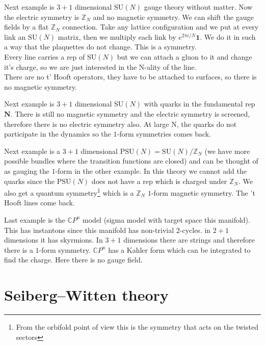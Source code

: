 \documentclass[11pt]{article}
\theoremstyle{definition}
\numberwithin{equation}{section}
\newcommand*\bbC{\mathbb{C}}
\newcommand*\bbZ{\mathbb{Z}}
\newcommand*\SU{\mathrm{SU}}
\begin{document}
Next example is $3+1$ dimensional $\SU(N)$ gauge theory without matter. Now the electric symmetry is $\bbZ_{N}$ and no magnetic symmetry. We can shift the gauge fields by a flat $\bbZ_{N}$ connection. Take any lattice configuration and we put at every link an $\SU(N)$ matrix, then we multiply each link by $e^{2\pi i/N}\mathbf{1}$. We do it in such a way that the plaquettes do not change. This is a symmetry.\\
Every line carries a rep of $\SU(N)$ but we can attach a gluon to it and change it's charge, so we are just interested in the N-ality of the line.\\
There are no t' Hooft operators, they have to be attached to surfaces, so there is no magnetic symmetry.

Next example is $3+1$ dimensional $\SU(N)$ with quarks in the fundamental rep $\mathbf{N}$. There is still no magnetic symmetry and the electric symmetry is screened, therefore there is no electric symmetry also. At large N, the quarks do not participate in the dynamics so the $1$-form symmetries comes back.

Next example is a $3+1$ dimensional $\text{PSU}(N)=\SU(N)/\bbZ_{N}$ (we have more possible bundles where the transition functions are closed) and can be thought of as gauging the $1$-form in the other example. In this theory we cannot add the quarks since the $\text{PSU}(N)$ does not have a rep which is charged under $\bbZ_{N}$. We also get a quantum symmetry\footnote{From the orbifold point of view this is the symmetry that acts on the twisted sectors} which is a $\bbZ_{N}$  $1$-form magnetic symmetry. The 't Hooft lines come back.

Last example is the $\bbC P^{n}$ model (sigma model with target space this manifold). This has instantons since this manifold has non-trivial $2$-cycles. in $2+1$ dimensions it has skyrmions. In $3+1$ dimensions there are strings and therefore there is a $1$-form symmetry. $\bbC P^{n}$ has a Kahler form which can be integrated to find the charge. Here there is no gauge field.


\section{Seiberg--Witten theory}
\end{document}
